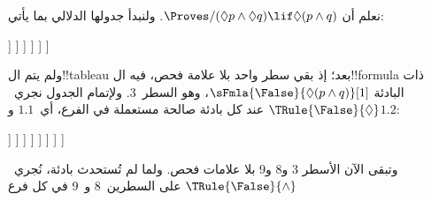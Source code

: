 \documentclass[../../../include/open-logic-section]{subfiles}
\begin{document}
{
\begin{ex}
  نعلم أن $\Proves/ (\Diamond p \land \Diamond q) \lif \Diamond(p
  \land q)$. ولنبدأ جدولها الدلالي بما يأتي:
  \begin{oltableau}
    [\pFmla{\False}{(\Diamond p \land \Diamond q) \lif \Diamond(p \land q)}{1},
      just = \TAss, checked
      [\pFmla{\True}{\Diamond p \land \Diamond q}{1},
        just = {\TRule{\False}{\lif}[1]}, checked
        [\pFmla{\False}{\Diamond(p \land q)}{1},
          just = {\TRule{\False}{\lif}[1]}
          [\pFmla{\True}{\Diamond p}{1},
            just = {\TRule{\True}{\land}[2]}, checked
            [\pFmla{\True}{\Diamond q}{1},
              just = {\TRule{\True}{\land}[2]}, checked
              [\pFmla{\True}{p}{1.1}, 
                just = {\TRule{\True}{\Diamond}[4]}, checked
                [\pFmla{\True}{q}{1.2}, 
                  just = {\TRule{\True}{\Diamond}[5]}, checked
                ]
              ]
            ]
          ]
        ]
      ]
    ]
  \end{oltableau}
  ولم يتم ال!!{tableau} بعد؛ إذ بقي سطر واحد بلا علامة فحص، فيه
  ال!!{formula} ذات البادئة
  $\sFmla{\False}{\Diamond(p \land q)}[1]$، وهو السطر~$3$.
  ولإتمام الجدول نجري~$\TRule{\False}{\Diamond}$ عند كل بادئة
  صالحة مستعملة في الفرع، أي~$1.1$ و$1.2$:
  \begin{oltableau}
    [\pFmla{\False}{(\Diamond p \land \Diamond q) \lif \Diamond(p \land q)}{1},
      just = \TAss, checked
      [\pFmla{\True}{\Diamond p \land \Diamond q}{1},
        just = {\TRule{\False}{\lif}[1]}, checked
        [\pFmla{\False}{\Diamond (p \land q)}{1},
          just = {\TRule{\False}{\lif}[1]}
          [\pFmla{\True}{\Diamond p}{1},
            just = {\TRule{\True}{\land}[2]}, checked
            [\pFmla{\True}{\Diamond q}{1},
              just = {\TRule{\True}{\land}[2]}, checked
              [\pFmla{\True}{p}{1.1}, 
                just = {\TRule{\True}{\Diamond}[4]}, checked
                [\pFmla{\True}{q}{1.2}, 
                  just = {\TRule{\True}{\Diamond}[5]}, checked
                  [\pFmla{\False}{p \land q}{1.1}, 
                    just = {\TRule{\False}{\Diamond}[3]}
                    [\pFmla{\False}{p \land q}{1.2}, 
                      just = {\TRule{\False}{\Diamond}[3]}
                    ]
                  ]
                ]
              ]
            ]
          ]
        ]
      ]
    ]
  \end{oltableau}
  وتبقى الآن الأسطر 3 و8 و9 بلا علامات فحص. ولما لم تُستحدث بادئة،
  نُجري~$\TRule{\False}{\land}$ على السطرين~8 و~9 في كل فرع

\end{ex}}
\end{document}
